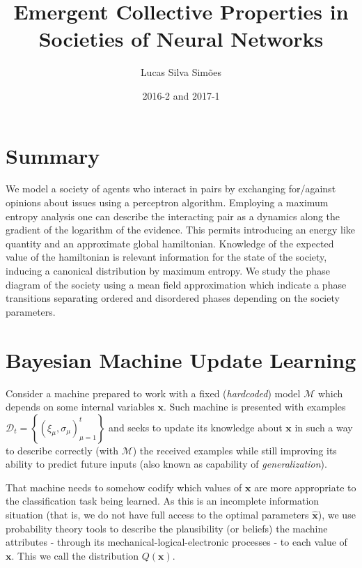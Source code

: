\documentclass[12pt,a4paperpaper,]{tufte-book}
\title{Emergent Collective Properties in Societies of Neural Networks}
\author{Lucas Silva Simões}
\date{2016-2 and 2017-1}
\begin{document}
\maketitle

{
\setcounter{tocdepth}{3}
\tableofcontents
}
\hypertarget{sec:summary}{%
\section{Summary}\label{sec:summary}}

We model a society of agents who interact in pairs by exchanging for/against opinions about issues using a perceptron algorithm. Employing a maximum entropy analysis one can describe the interacting pair as a dynamics along the gradient of the logarithm of the evidence. This permits introducing an energy like quantity and an approximate global hamiltonian. Knowledge of the expected value of the hamiltonian is relevant information for the state of the society, inducing a canonical distribution by maximum entropy. We study the phase diagram of the society using a mean field approximation which indicate a phase transitions separating ordered and disordered phases depending on the society parameters.

\hypertarget{sec:bayeslearn}{%
\section{Bayesian Machine Update Learning}\label{sec:bayeslearn}}

Consider a machine prepared to work with a fixed (\emph{hardcoded}) model \(\mathcal{M}\) which depends on some internal variables \(\mathbf{x}\). Such machine is presented with examples \(\mathcal{D}_t = \left\{ (\xi_\mu, \sigma_\mu)_{\mu=1}^t \right\}\) and seeks to update its knowledge about \(\mathbf{x}\) in such a way to describe correctly (with \(\mathcal{M}\)) the received examples while still improving its ability to predict future inputs (also known as capability of \emph{generalization}).

That machine needs to somehow codify which values of \(\mathbf{x}\) are more appropriate to the classification task being learned. As this is an incomplete information situation (that is, we do not have full access to the optimal parameters \(\hat{\mathbf{x}}\)), we use probability theory tools to describe the plausibility (or beliefs) the machine attributes - through its mechanical-logical-electronic processes - to each value of \(\mathbf{x}\). This we call the distribution \(Q(\mathbf{x})\).
\end{document}
